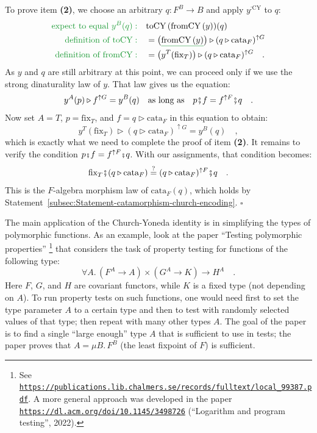 To prove item \textbf{(2)}, we choose an arbitrary $q:F^{B}\rightarrow B$
and apply $y^{:\text{CY}}$ to $q$:
\begin{align*}
{\color{greenunder}\text{expect to equal }y^{B}(q):}\quad & \text{toCY}\,(\text{fromCY}\,(y))(q)\\
{\color{greenunder}\text{definition of }\text{toCY}:}\quad & =\big(\gunderline{\text{fromCY}\,(y)}\big)\triangleright(q\triangleright\text{cata}_{F})^{\uparrow G}\\
{\color{greenunder}\text{definition of }\text{fromCY}:}\quad & =\big(y^{T}(\text{fix}_{T})\big)\triangleright(q\triangleright\text{cata}_{F})^{\uparrow G}\quad.
\end{align*}
As $y$ and $q$ are still arbitrary at this point, we can proceed
only if we use the strong dinaturality law of $y$. That law gives
us the equation:
\[
y^{A}(p)\triangleright f^{\uparrow G}=y^{B}(q)\quad\text{as long as}\quad p\bef f=f^{\uparrow F}\bef q\quad.
\]
Now set $A=T$, $p=\text{fix}_{T}$, and $f=q\triangleright\text{cata}_{F}$
in this equation to obtain:
\[
y^{T}(\text{fix}_{T})\triangleright(q\triangleright\text{cata}_{F})^{\uparrow G}=y^{B}(q)\quad,
\]
which is exactly what we need to complete the proof of item \textbf{(2)}.
It remains to verify the condition $p\bef f=f^{\uparrow F}\bef q$.
With our assignments, that condition becomes:
\[
\text{fix}_{T}\bef(q\triangleright\text{cata}_{F})\overset{?}{=}(q\triangleright\text{cata}_{F})^{\uparrow F}\bef q\quad.
\]
This is the $F$-algebra morphism law of $\text{cata}_{F}(q)$, which
holds by Statement~\ref{subsec:Statement-catamorphism-church-encoding}.
$\square$

The main application of the Church-Yoneda identity is in simplifying
the types of polymorphic functions. As an example, look at the paper
\textsf{``}Testing polymorphic properties\textsf{''} \footnote{See \texttt{\href{https://publications.lib.chalmers.se/records/fulltext/local_99387.pdf}{https://publications.lib.chalmers.se/records/fulltext/local\_99387.pdf}}.
A more general approach was developed in the paper \texttt{\href{https://dl.acm.org/doi/10.1145/3498726}{https://dl.acm.org/doi/10.1145/3498726}}
(\textsf{``}Logarithm and program testing\textsf{''}, 2022).} that considers the task of property testing for functions of the
following type:
\begin{equation}
\forall A.\,(F^{A}\rightarrow A)\times(G^{A}\rightarrow K)\rightarrow H^{A}\quad.\label{eq:type-from-testing-polymorphic-paper}
\end{equation}
Here $F$, $G$, and $H$ are covariant functors, while $K$ is a
fixed type (not depending on $A$). To run property tests on such
functions, one would need first to set the type parameter $A$ to
a certain type and then to test with randomly selected values of that
type; then repeat with many other types $A$. The goal of the paper
is to find a single \textsf{``}large enough\textsf{''} type $A$ that is sufficient
to use in tests; the paper proves that $A=\mu B.\,F^{B}$ (the least
fixpoint of $F$) is sufficient.

